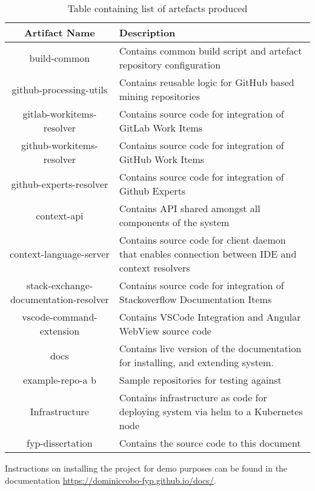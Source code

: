 \begin{table}[h!]
\centering
\begin{tabular}{|c|p{8cm}|}
	\hline 
	Artifact Name & Description \\ 
	\hline 
	build-common & Contains common build script and artefact repository configuration \\ 
	\hline 
	github-processing-utils & Contains reusable logic for GitHub based mining repositories \\ 
	\hline 
	gitlab-workitems-resolver & Contains source code for integration of GitLab Work Items  \\ 
	\hline 
	github-workitems-resolver & Contains source code for integration of GitHub Work Items \\ 
	\hline 
	github-experts-resolver & Contains source code for integration of Github Experts \\ 
	\hline 
	context-api & Contains API shared amongst all components of the system \\ 
	\hline 
	context-language-server & Contains source code for client daemon that enables connection between IDE and context resolvers \\ 
	\hline 
	stack-exchange-documentation-resolver & Contains source code for integration of Stackoverflow Documentation Items \\ 
	\hline 
	vscode-command-extension & Contains VSCode Integration and Angular WebView source code \\ 
	\hline 
	docs & Contains live version of the documentation for installing, and extending system. \\ 
	\hline 
	example-repo-a b & Sample repositories for testing against \\ 
	\hline 
	Infrastructure & Contains infrastructure as code for deploying system via helm to a Kubernetes node \\ 
	\hline 
	fyp-dissertation & Contains the source code to this document \\ 
	\hline 
\end{tabular} 
\caption{Table containing list of artefacts produced}
\label{table:artefactsInProject}
\end{table}

Instructions on installing the project for demo purposes can be found in the documentation \url{https://dominiccobo-fyp.github.io/docs/}.